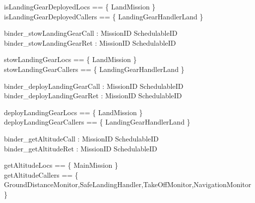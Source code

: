 %
\begin{zed}
isLandingGearDeployedLocs == \{ LandMission \}  \\
isLandingGearDeployedCallers == \{ LandingGearHandlerLand \}
\end{zed}
%
\begin{circus}

\circchannel binder\_stowLandingGearCall :  MissionID  \cross SchedulableID  \\
\circchannel binder\_stowLandingGearRet : MissionID  \cross SchedulableID  \\
\end{circus}
%
\begin{zed}
stowLandingGearLocs == \{ LandMission \}  \\
stowLandingGearCallers == \{ LandingGearHandlerLand \}
\end{zed}
%
\begin{circus}

\circchannel binder\_deployLandingGearCall :  MissionID  \cross SchedulableID  \\
\circchannel binder\_deployLandingGearRet : MissionID  \cross SchedulableID  \\
\end{circus}
%
\begin{zed}
deployLandingGearLocs == \{ LandMission \}  \\
deployLandingGearCallers == \{ LandingGearHandlerLand \}
\end{zed}
%
\begin{circus}

\circchannel binder\_getAltitudeCall :  MissionID  \cross SchedulableID  \\
\circchannel binder\_getAltitudeRet : MissionID \cross SchedulableID \cross {} \\
\end{circus}
%
\begin{zed}
getAltitudeLocs == \{ MainMission \}  \\
getAltitudeCallers == \{ GroundDistanceMonitor,SafeLandingHandler,TakeOffMonitor,NavigationMonitor \}
\end{zed}
%

